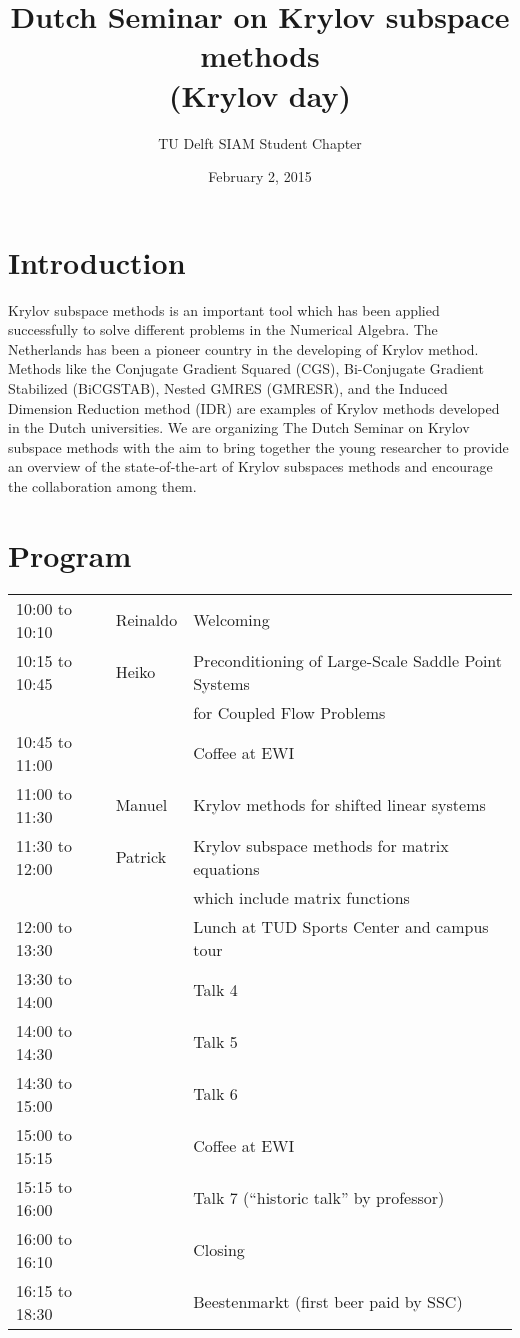 \documentclass{article}
\title{Dutch Seminar on Krylov subspace methods \\(Krylov day)}
\author{TU Delft SIAM Student Chapter}
\date{February 2, 2015}
\begin{document}
\maketitle
\section{Introduction}
Krylov subspace methods is an important tool which has been applied successfully to solve different problems 
in the Numerical Algebra. The Netherlands has been a pioneer country in the developing of Krylov method.
Methods like the Conjugate Gradient Squared (CGS), Bi-Conjugate Gradient Stabilized (BiCGSTAB), Nested GMRES (GMRESR), and the Induced Dimension Reduction method (IDR)  
are examples of Krylov methods developed in the Dutch universities. 
We are organizing The Dutch Seminar on Krylov subspace methods with the aim 
to bring together the young researcher to provide an
overview of the state-of-the-art of Krylov subspaces methods and encourage 
the collaboration among them.
\newpage
\section{Program}
\begin{table}[h]
\begin{tabular}{|l|l|l|}
\hline
10:00 to 10:10 & Reinaldo & Welcoming \\
10:15 to 10:45 & Heiko & Preconditioning of Large-Scale Saddle Point Systems \\ 
 & & for Coupled Flow Problems\\
10:45 to 11:00 & & Coffee at EWI\\ 
11:00 to 11:30 & Manuel & Krylov methods for shifted linear systems\\
11:30 to 12:00 & Patrick &  Krylov subspace methods for matrix equations\\
 & & which include matrix functions\\
12:00 to 13:30 & &  Lunch at TUD Sports Center and campus tour\\
13:30 to 14:00 & & Talk 4\\
14:00 to 14:30 & & Talk 5\\
14:30 to 15:00 & & Talk 6\\
15:00 to 15:15 & &  Coffee at EWI \\
15:15 to 16:00 & & Talk 7 (``historic talk'' by professor)\\
16:00 to 16:10 & &  Closing\\
16:15 to 18:30 & & Beestenmarkt (first beer paid by SSC) \\
\hline
\end{tabular}
\end{table}
\end{document}
